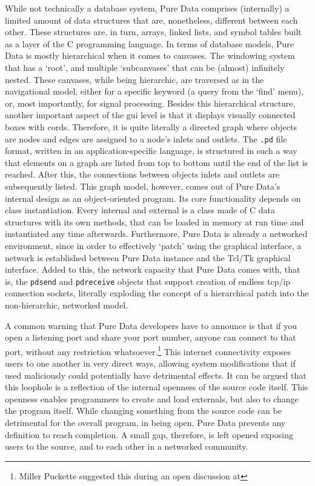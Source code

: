 \documentclass[
]{book}
\newcommand{\obj}[1]{\framebox{{\small\textbf{\texttt{#1}}}}}
\begin{document}
While not technically a database system, Pure Data comprises (internally) a limited amount of data structures that are, nonetheless, different between each other. These structures are, in turn, arrays, linked lists, and symbol tables built as a layer of the C programming language. In terms of database models, Pure Data is mostly hierarchical when it comes to canvases. The windowing system that has a `root', and multiple `subcanvases' that can be (almost) infinitely nested. These canvases, while being hierarchic, are traversed as in the navigational model, either for a specific keyword (a query from the `find' menu), or, most importantly, for signal processing. Besides this hierarchical structure, another important aspect of the \gls{gui} level is that it displays visually connected boxes with cords. Therefore, it is quite literally a directed graph where objects are nodes and edges are assigned to a node's inlets and outlets. The \texttt{.pd} file format, written in an application-specific language, is structured in such a way that elements on a graph are listed from top to bottom until the end of the list is reached. After this, the connections between objects inlets and outlets are subsequently listed. This graph model, however, comes out of Pure Data's internal design as an object-oriented program. Its core functionality depends on class instantiation. Every internal and external is a class made of C data structures with its own methods, that can be loaded in memory at run time and instantiated any time afterwards. Furthermore, Pure Data is already a networked environment, since in order to effectively `patch' using the graphical interface, a network is established between Pure Data instance and the Tcl/Tk graphical interface. Added to this, the network capacity that Pure Data comes with, that is, the \texttt{pdsend} and \texttt{pdreceive} objects that support creation of endless \gls{tcp/ip} connection sockets, literally exploding the concept of a hierarchical patch into the non-hierarchic, networked model. 

A common warning that Pure Data developers have to announce is that if you open a listening port and share your port number, anyone can connect to that port, without any restriction whatsoever.\footnote{Miller Puckette suggested this during an open discussion at \obj{PdCon16}} This internet connectivity exposes users to one another in very direct ways, allowing system modifications that if used maliciously could potentially have detrimental effects. It can be argued that this loophole is a reflection of the internal openness of the source code itself. This openness enables programmers to create and load externals, but also to change the program itself. While changing something from the source code can be detrimental for the overall program, in being open, Pure Data prevents any definition to reach completion. A small gap, therefore, is left opened exposing users to the source, and to each other in a networked community.
\end{document}
